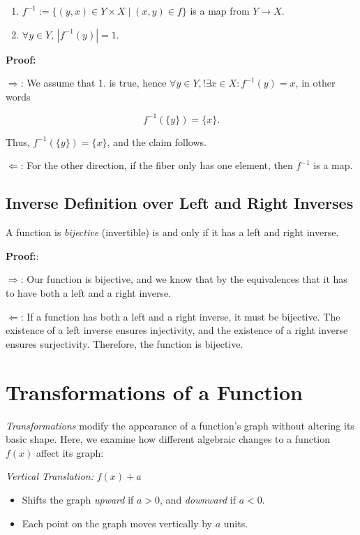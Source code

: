 \begin{enumerate}

	\item \(f^{-1}:= \{(y, x) \in Y \times X \mid (x, y) \in f\}\) is a map from \(Y \to X\).

	\item  \(\forall y \in Y, \, |f^{-1}(y)| = 1\).

\end{enumerate}

\textbf{Proof:}

\(\Rightarrow\): We assume that 1. is true, hence \(\forall y \in Y, !\exists x \in X: f^{-1}(y) = x\), in other words

\[
	f^{-1}(\{y\}) = \{x\}.
\]

Thus, \(f^{-1}(\{y\}) = \{x\}\), and the claim follows.

\(\Leftarrow\): For the other direction, if the fiber only has one element, then \(f^{-1}\) is a map.

\QED

\subsection{Inverse Definition over Left and Right Inverses}

A function is \emph{bijective} (invertible) is and only if it has a left and right inverse.

\textbf{Proof:}:

\(\Rightarrow\): Our function is bijective, and we know that by the equivalences that it has to have both a left and a right inverse.

\(\Leftarrow\): If a function has both a left and a right inverse, it must be bijective. The existence of a left inverse ensures injectivity, and the existence of a right inverse ensures surjectivity. Therefore, the function is bijective.

\QED

\section{Transformations of a Function}

\emph{Transformations} modify the appearance of a function's graph without altering its basic shape.
Here, we examine how different algebraic changes to a function \( f(x) \) affect its graph:

\emph{Vertical Translation:} \( f(x) + a \)

\begin{itemize}

	\item Shifts the graph \emph{upward} if \( a > 0 \), and \emph{downward} if \( a < 0 \).

	\item Each point on the graph moves vertically by \(a\) units.

\end{itemize}

